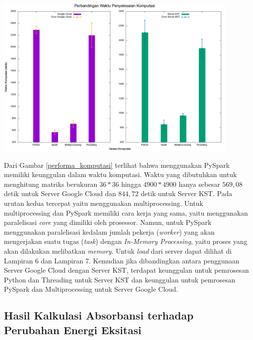 \documentclass[12pt,a4paper]{report}
\begin{document}
\begin{center}
	\includegraphics[width=12cm]{gambar/performa_komputasi.png}
	\label{performa_komputasi}
\end{center}

Dari Gambar \ref{performa_komputasi} terlihat bahwa menggunakan PySpark memiliki keunggulan dalam waktu komputasi. Waktu yang dibutuhkan untuk menghitung matriks berukuran $36*36$ hingga $4900*4900$ hanya sebesar $569,08$ detik untuk Server Google Cloud dan $844,72$ detik untuk Server KST. Pada urutan kedua tercepat yaitu menggunakan multiprocessing. Untuk multiprocessing dan PySpark memiliki cara kerja yang sama, yaitu menggunakan paralelisasi \textit{core} yang dimiliki oleh prosessor. Namun, untuk PySpark menggunakan paralelisasi kedalam jumlah pekerja (\textit{worker}) yang akan mengerjakan suatu tugas (\textit{task}) dengan \textit{In-Memory Processing}, yaitu proses yang akan dilakukan melibatkan \textit{memory}. Untuk \textit{load} dari server dapat dilihat di Lampiran 6 dan Lampiran 7. Kemudian jika dibandingkan antara penggunaan Server Google Cloud dengan Server KST, terdapat keunggulan untuk pemrosesan Python dan Threading untuk Server KST dan keunggulan untuk pemrosesan PySpark dan Multiprocessing untuk Server Google Cloud.

\subsection{Hasil Kalkulasi Absorbansi terhadap Perubahan Energi Eksitasi}
\end{document}
